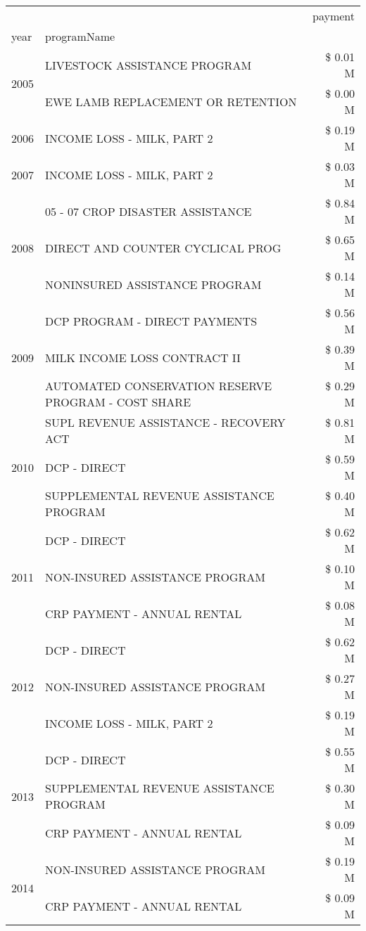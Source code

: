 \begin{tabular}{llr}
\toprule
 &  & payment \\
year & programName &  \\
\midrule
\multirow[t]{2}{*}{2005} & LIVESTOCK ASSISTANCE PROGRAM & \$ 0.01 M \\
 & EWE LAMB REPLACEMENT OR RETENTION & \$ 0.00 M \\
\cline{1-3}
2006 & INCOME LOSS - MILK, PART 2 & \$ 0.19 M \\
\cline{1-3}
2007 & INCOME LOSS - MILK, PART 2 & \$ 0.03 M \\
\cline{1-3}
\multirow[t]{3}{*}{2008} & 05 - 07 CROP DISASTER ASSISTANCE & \$ 0.84 M \\
 & DIRECT AND COUNTER CYCLICAL PROG & \$ 0.65 M \\
 & NONINSURED ASSISTANCE PROGRAM & \$ 0.14 M \\
\cline{1-3}
\multirow[t]{3}{*}{2009} & DCP PROGRAM - DIRECT PAYMENTS & \$ 0.56 M \\
 & MILK INCOME LOSS CONTRACT II & \$ 0.39 M \\
 & AUTOMATED CONSERVATION RESERVE PROGRAM - COST SHARE & \$ 0.29 M \\
\cline{1-3}
\multirow[t]{3}{*}{2010} & SUPL REVENUE ASSISTANCE - RECOVERY ACT & \$ 0.81 M \\
 & DCP - DIRECT & \$ 0.59 M \\
 & SUPPLEMENTAL REVENUE ASSISTANCE PROGRAM & \$ 0.40 M \\
\cline{1-3}
\multirow[t]{3}{*}{2011} & DCP - DIRECT & \$ 0.62 M \\
 & NON-INSURED ASSISTANCE PROGRAM & \$ 0.10 M \\
 & CRP PAYMENT - ANNUAL RENTAL & \$ 0.08 M \\
\cline{1-3}
\multirow[t]{3}{*}{2012} & DCP - DIRECT & \$ 0.62 M \\
 & NON-INSURED ASSISTANCE PROGRAM & \$ 0.27 M \\
 & INCOME LOSS - MILK, PART 2 & \$ 0.19 M \\
\cline{1-3}
\multirow[t]{3}{*}{2013} & DCP - DIRECT & \$ 0.55 M \\
 & SUPPLEMENTAL REVENUE ASSISTANCE PROGRAM & \$ 0.30 M \\
 & CRP PAYMENT - ANNUAL RENTAL & \$ 0.09 M \\
\cline{1-3}
\multirow[t]{3}{*}{2014} & NON-INSURED ASSISTANCE PROGRAM & \$ 0.19 M \\
 & CRP PAYMENT - ANNUAL RENTAL & \$ 0.09 M \\

\end{tabular}
